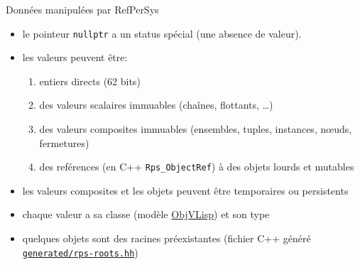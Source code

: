 \documentclass[final,a4,xcolor={svgnames,dvipsnames}]{beamer}
\begin{document}
 \begin{frame}{Données manipulées par RefPerSys}

   \begin{itemize}
   \item le pointeur \texttt{nullptr} a un status spécial (une absence de valeur).
   \item les valeurs {} peuvent être:
     \begin{enumerate}
     \item entiers directs (62 bits)
     \item des valeurs scalaires immuables (chaînes, flottants, \ldots)
     \item des valeurs composites immuables (ensembles, tuples,
       instances, n{\oe}uds, fermetures)
       \item des reférences (en C++ \texttt{Rps\_ObjectRef}) à des objets lourds et mutables
     \end{enumerate}
     \item les valeurs composites et les objets peuvent être
       temporaires ou persistents
       \item chaque valeur a sa classe (modèle
         \href{https://en.wikipedia.org/wiki/ObjVlisp}{ObjVLisp})
         et son type  {}
       \item quelques objets sont des racines préexistantes (fichier
         C++ généré \href{https://github.com/RefPerSys/RefPerSys/blob/master/generated/rps-roots.hh}{\texttt{generated/rps-roots.hh}})
   \end{itemize}

 \end{frame}
\end{document}
